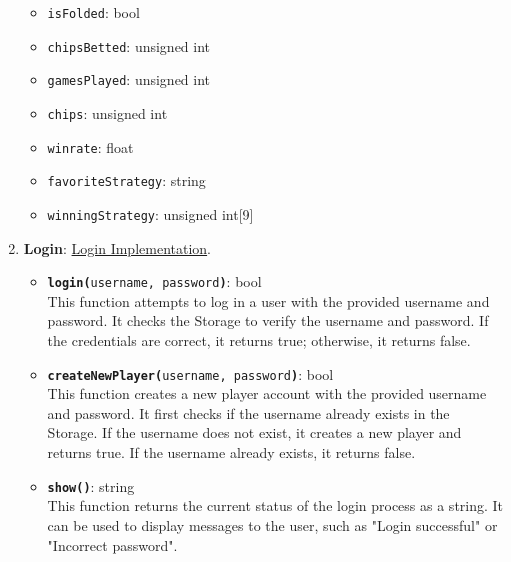 \begin{enumerate}
\begin{itemize}
        \item \texttt{isFolded}: bool
        \item \texttt{chipsBetted}: unsigned int
        \item \texttt{gamesPlayed}: unsigned int
        \item \texttt{chips}: unsigned int
        \item \texttt{winrate}: float
        \item \texttt{favoriteStrategy}: string
        \item \texttt{winningStrategy}: unsigned int[9]
    \end{itemize}

    \item \textbf{Login}: \href{https://github.com/anhtri2407/Poker/blob/main/src/core/Login.cpp}{Login Implementation}.
    \begin{itemize}
        \item \texttt{\textbf{login(}username, password\textbf{)}}: bool \\
        This function attempts to log in a user with the provided username and password. It checks the Storage to verify the username and password. If the credentials are correct, it returns true; otherwise, it returns false.
        \item \texttt{\textbf{createNewPlayer(}username, password\textbf{)}}: bool \\
        This function creates a new player account with the provided username and password. It first checks if the username already exists in the Storage. If the username does not exist, it creates a new player and returns true. If the username already exists, it returns false.
        \item \texttt{\textbf{show()}}: string \\
        This function returns the current status of the login process as a string. It can be used to display messages to the user, such as "Login successful" or "Incorrect password".
    \end{itemize}
    

\end{enumerate}
